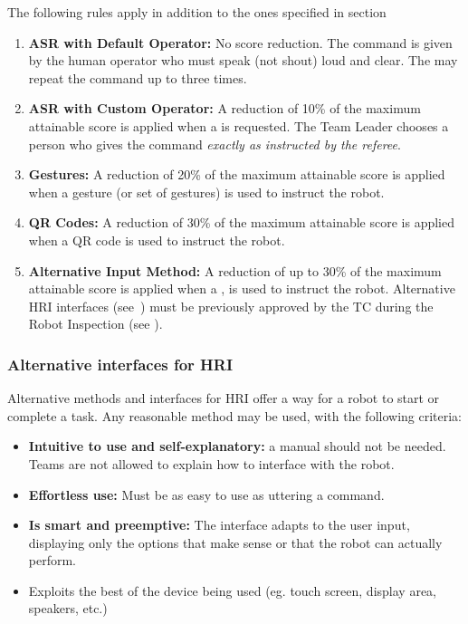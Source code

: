 The following rules apply in addition to the ones specified in section 
\begin{enumerate}
	\item \textbf{ASR with Default Operator:} No score reduction.
	The command is given by the human operator who must speak (not shout) loud and clear.
	The  may repeat the command up to three times.

	\item \textbf{ASR with Custom Operator:} A reduction of 10\% of the maximum attainable score is applied when a  is requested.
	The Team Leader chooses a person who gives the command \emph{exactly as instructed by the referee}.

	\item \textbf{Gestures:} A reduction of 20\% of the maximum attainable score is applied when a gesture (or set of gestures) is used to instruct the robot.

	\item \textbf{QR Codes:} A reduction of 30\% of the maximum attainable score is applied when a QR code is used to instruct the robot.

	\item \textbf{Alternative Input Method:} A reduction of up to 30\% of the maximum attainable score is applied when a , is used to instruct the robot.
	Alternative HRI interfaces (see~) must be previously approved by the TC during the Robot Inspection (see \Organisation).
\end{enumerate}


\subsubsection{Alternative interfaces for HRI}
\label{rule:asralternative}
Alternative methods and interfaces for HRI offer a way for a robot to start or complete a task.
Any reasonable method may be used, with the following criteria:
\begin{itemize}
	\item \textbf{Intuitive to use and self-explanatory:} a manual should not be needed. Teams are not allowed to explain how to interface with the robot. %

	\item \textbf{Effortless use:} Must be as easy to use as uttering a command. %

	\item \textbf{Is smart and preemptive:} The interface adapts to the user input, displaying only the options that make sense or that the robot can actually perform.

	\item Exploits the best of the device being used (eg. touch screen, display area, speakers, etc.)
\end{itemize}

